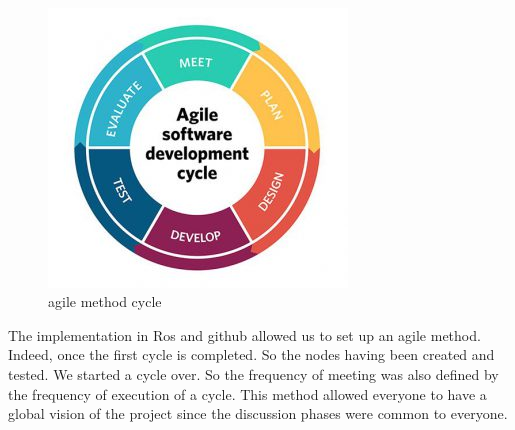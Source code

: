 \paragraph{}
\begin{figure}[ht!]
    \begin{center}
        \includegraphics[scale=0.3]{Images/agile_method.jpg}
    \end{center}
    \caption{agile method cycle}
    \label{fig:agile_method}
\end{figure}
The implementation in Ros and github allowed us to set up an agile method. 
Indeed, once the first cycle is completed. 
So the nodes having been created and tested. We started a cycle over. 
So the frequency of meeting was also defined by the frequency of execution of a cycle. This method allowed everyone to have a global vision of the project since the discussion phases were common to everyone.


